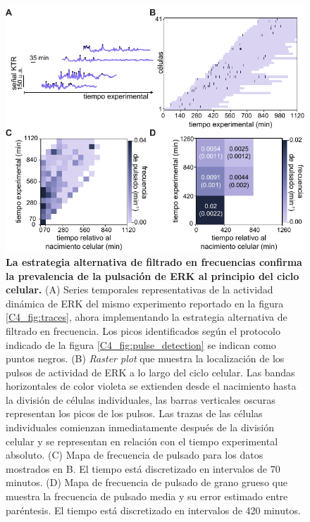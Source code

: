 \documentclass[./main.tex]{subfiles}
\begin{document}
\begin{subappendices}
\begin{figure}
    \centering
    \includegraphics[width=1\columnwidth]{figures/chapter4/C4_band_pass_filter_cell_cycle.pdf}\caption{\textbf{La estrategia alternativa de filtrado en frecuencias confirma la prevalencia de la pulsación de ERK al principio del ciclo celular.} (A) Series temporales representativas de la actividad dinámica de ERK del mismo experimento reportado en la figura \ref{C4_fig:traces}, ahora implementando la estrategia alternativa de filtrado en frecuencia. Los picos identificados según el protocolo indicado de la figura \ref{C4_fig:pulse_detection} se indican como puntos negros. (B) \textit{Raster plot} que muestra la localización de los pulsos de actividad de ERK a lo largo del ciclo celular. Las bandas horizontales de color violeta se extienden desde el nacimiento hasta la división de células individuales, las barras verticales oscuras representan los picos de los pulsos. Las trazas de las células individuales comienzan inmediatamente después de la división celular y se representan en relación con el tiempo experimental absoluto. (C) Mapa de frecuencia de pulsado para los datos mostrados en B. El tiempo está discretizado en intervalos de 70 minutos. (D) Mapa de frecuencia de pulsado de grano grueso que muestra la frecuencia de pulsado media y su error estimado entre paréntesis. El tiempo está discretizado en intervalos de 420 minutos.}
    \label{C4_fig:band_pass_filter_cell_cycle}
\end{figure}




\end{subappendices}
\end{document}
